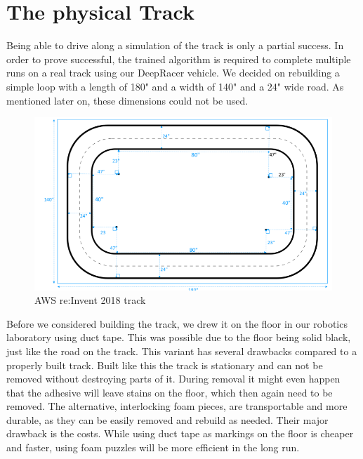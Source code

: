 \chapter{The physical Track}

Being able to drive along a simulation of the track is only a partial success. In order to prove successful, the trained algorithm is required to complete multiple runs on a real track using our DeepRacer vehicle. We decided on rebuilding a simple loop with a length of 180" and a width of 140" and a 24" wide road. As mentioned later on, these dimensions could not be used.

\begin{figure}
    \centering
    \includegraphics[width=.85\textwidth]{images/deepracer-track-loop.png}
    \caption{AWS re:Invent 2018 track}
    \label{fig:track}
\end{figure}

Before we considered building the track, we drew it on the floor in our robotics laboratory using duct tape. This was possible due to the floor being solid black, just like the road on the track. This variant has several drawbacks compared to a properly built track. Built like this the track is stationary and can not be removed without destroying parts of it. During removal it might even happen that the adhesive will leave stains on the floor, which then again need to be removed. The alternative, interlocking foam pieces, are transportable and more durable, as they can be easily removed and rebuild as needed. Their major drawback is the costs. While using duct tape as markings on the floor is cheaper and faster, using foam puzzles will be more efficient in the long run.


